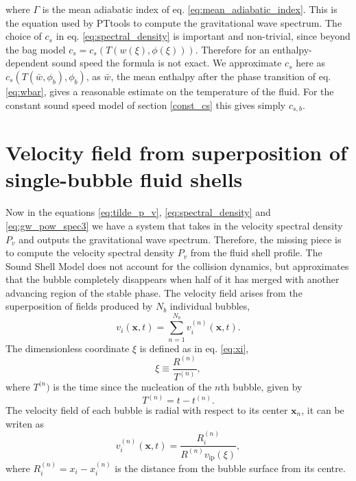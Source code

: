 where $\Gamma$ is the mean adiabatic index of eq. \eqref{eq:mean_adiabatic_index}.
This is the equation used by PTtools to compute the gravitational wave spectrum.
The choice of $c_s$ in eq. \eqref{eq:spectral_density} is important and non-trivial,
since beyond the bag model $c_s = c_s(T(w(\xi),\phi(\xi)))$.
Therefore for an enthalpy-dependent sound speed the formula is not exact.
We approximate $c_s$ here as $c_s(T(\bar{w},\phi_b),\phi_b)$,
as $\bar{w}$, the mean enthalpy after the phase transition of eq. \eqref{eq:wbar},
gives a reasonable estimate on the temperature of the fluid.
For the constant sound speed model of section \ref{const_cs} this gives simply $c_{s,b}$.


\section{Velocity field from superposition of single-bubble fluid shells}
\label{velocity_field}
Now in the equations \ref{eq:tilde_p_v}, \ref{eq:spectral_density} and \ref{eq:gw_pow_spec3} we have a system that takes in the velocity spectral density $P_v$ and outputs the gravitational wave spectrum.
Therefore, the missing piece is to compute the velocity spectral density $P_v$ from the fluid shell profile.
The Sound Shell Model does not account for the collision dynamics, but approximates that the bubble completely disappears when half of it has merged with another advancing region of the stable phase.
The velocity field arises from the superposition of fields produced by $N_b$ individual bubbles,
\cite[eq. 4.1]{hindmarsh_gw_pt_2019}
\begin{equation}
v_i(\mathbf{x},t) = \sum_{n=1}^{N_b} v_i^{(n)} (\mathbf{x},t).
\end{equation}
The dimensionless coordinate $\xi$ is defined as in eq. \eqref{eq:xi},
\begin{equation}
\xi \equiv \frac{R^{(n)}}{T^{(n)}},
\end{equation}
where $T^{(n})$ is the time since the nucleation of the $n$th bubble, given by
\begin{equation}
T^{(n)} = t - t^{(n)}.
\label{eq:bubble_lifetime}
\end{equation}
The velocity field of each bubble is radial with respect to its center $\mathbf{x}_n$, it can be writen as
\cite[eq. 4.2]{hindmarsh_gw_pt_2019}
\begin{equation}
v_i^{(n)}(\mathbf{x},t) = \frac{R_i^{(n)}}{R^{(n)} v_\text{ip}(\xi)},
\end{equation}
where $R_i^{(n)} = x_i - x_i^{(n)}$ is the distance from the bubble surface from its centre.
